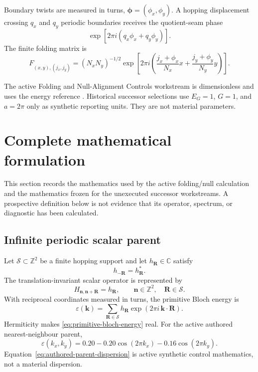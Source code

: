 \documentclass[11pt]{article}
\begin{document}
Boundary twists are measured in turns,
$\boldsymbol\phi=(\phi_x,\phi_y)$.  A hopping displacement crossing $q_x$ and $q_y$
periodic boundaries receives the quotient-seam phase
\begin{equation}
  \exp\!\left[2\pi i(q_x\phi_x+q_y\phi_y)\right].
\end{equation}
The finite folding matrix is
\begin{equation}
  F_{(x,y),(j_x,j_y)}=
  (N_xN_y)^{-1/2}
  \exp\!\left[
    2\pi i\left(
      \frac{j_x+\phi_x}{N_x}x+
      \frac{j_y+\phi_y}{N_y}y
    \right)
  \right].
\end{equation}

The active Folding and Null-Alignment Controls workstream is dimensionless and uses the
energy reference .  Historical successor selections
use $E_G=1$, $G=1$, and $a=2\pi$ only as synthetic reporting units.  They are not
material parameters.

\section{Complete mathematical formulation}

This section records the mathematics used by the active folding/null calculation and
the mathematics frozen for the unexecuted successor workstreams.  A prospective
definition below is not evidence that its operator, spectrum, or diagnostic has been
calculated.

\subsection{Infinite periodic scalar parent}

Let $\mathcal S\subset\mathbb Z^2$ be a finite hopping support and let
$h_{\mathbf R}\in\mathbb C$ satisfy
\begin{equation}
  h_{-\mathbf R}=h_{\mathbf R}^{*}.
\end{equation}
The translation-invariant scalar operator is represented by
\begin{equation}
  H_{\mathbf n,\mathbf n+\mathbf R}=h_{\mathbf R},
  \qquad \mathbf n\in\mathbb Z^2,
  \quad \mathbf R\in\mathcal S.
\end{equation}
With reciprocal coordinates measured in turns, the primitive Bloch energy is
\begin{equation}
  \varepsilon(\mathbf k)
  =\sum_{\mathbf R\in\mathcal S}
    h_{\mathbf R}\exp\!\left(2\pi i\,\mathbf k\cdot\mathbf R\right).
  \label{eq:primitive-bloch-energy}
\end{equation}
Hermiticity makes \eqref{eq:primitive-bloch-energy} real.  For the active authored
nearest-neighbour parent,
\begin{equation}
  \varepsilon(k_x,k_y)
  =0.20-0.20\cos(2\pi k_x)-0.16\cos(2\pi k_y).
  \label{eq:authored-parent-dispersion}
\end{equation}
Equation~\eqref{eq:authored-parent-dispersion} is active synthetic control mathematics,
not a material dispersion.
\end{document}
